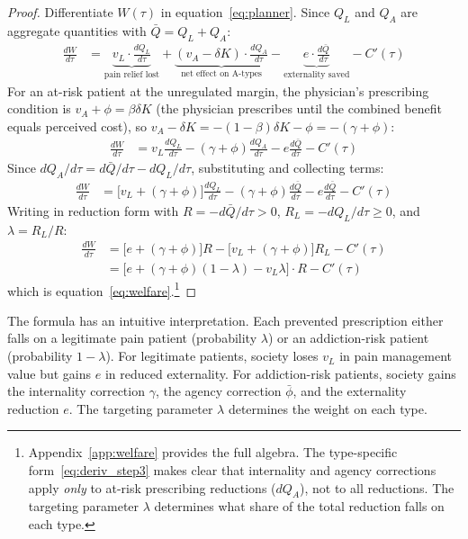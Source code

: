 \documentclass[12pt]{article}
\begin{document}
\begin{proof}
Differentiate $W(\tau)$ in equation~\eqref{eq:planner}. Since $Q_L$ and $Q_A$ are aggregate quantities with $\bar{Q} = Q_L + Q_A$:
\begin{align}
\frac{dW}{d\tau} &= \underbrace{v_L \cdot \frac{dQ_L}{d\tau}}_{\text{pain relief lost}} + \underbrace{(v_A - \delta K) \cdot \frac{dQ_A}{d\tau}}_{\text{net effect on A-types}} - \underbrace{e \cdot \frac{d\bar{Q}}{d\tau}}_{\text{externality saved}} - C'(\tau) \label{eq:deriv_step1}
\end{align}
For an at-risk patient at the unregulated margin, the physician's prescribing condition is $v_A + \phi = \beta \delta K$ (the physician prescribes until the combined benefit equals perceived cost), so $v_A - \delta K = -(1-\beta)\delta K - \phi = -(\gamma + \phi)$:
\begin{align}
\frac{dW}{d\tau} &= v_L \frac{dQ_L}{d\tau} - (\gamma + \phi) \frac{dQ_A}{d\tau} - e \frac{d\bar{Q}}{d\tau} - C'(\tau) \label{eq:deriv_step3}
\end{align}
Since $dQ_A/d\tau = d\bar{Q}/d\tau - dQ_L/d\tau$, substituting and collecting terms:
\begin{align}
\frac{dW}{d\tau} &= \big[v_L + (\gamma+\phi)\big]\frac{dQ_L}{d\tau} - (\gamma + \phi) \frac{d\bar{Q}}{d\tau} - e \frac{d\bar{Q}}{d\tau} - C'(\tau) \nonumber
\end{align}
Writing in reduction form with $R = -d\bar{Q}/d\tau > 0$, $R_L = -dQ_L/d\tau \geq 0$, and $\lambda = R_L/R$:
\begin{align}
\frac{dW}{d\tau} &= \Big[e + (\gamma+\phi)\Big]R - \Big[v_L + (\gamma+\phi)\Big]R_L - C'(\tau) \nonumber \\
&= \Big[e + (\gamma+\phi)(1-\lambda) - v_L\lambda\Big]\cdot R - C'(\tau) \label{eq:deriv_lambda}
\end{align}
which is equation~\eqref{eq:welfare}.\footnote{Appendix~\ref{app:welfare} provides the full algebra. The type-specific form~\eqref{eq:deriv_step3} makes clear that internality and agency corrections apply \textit{only} to at-risk prescribing reductions ($dQ_A$), not to all reductions. The targeting parameter $\lambda$ determines what share of the total reduction falls on each type.} \qedhere
\end{proof}

The formula has an intuitive interpretation. Each prevented prescription either falls on a legitimate pain patient (probability $\lambda$) or an addiction-risk patient (probability $1-\lambda$). For legitimate patients, society loses $v_L$ in pain management value but gains $e$ in reduced externality. For addiction-risk patients, society gains the internality correction $\gamma$, the agency correction $\bar{\phi}$, and the externality reduction $e$. The targeting parameter $\lambda$ determines the weight on each type.
\end{document}
